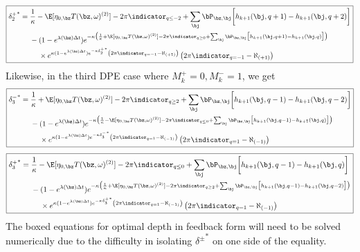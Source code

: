 \documentclass[12pt]{article}
\begin{document}
\begin{equation}
\label{eq:discretedeltaplus2feedback}
\boxed{
\begin{split}
{\delta_{2}^+}^* & = \frac{1}{\kappa} - \E[\eta_{0,\bz} T(\bz, \omega)^{(2)}] - 2 \pi \indicator_{q \leq -2} + \sum_\bj \bP_{\bz,\bj} \biggl[ h_{k+1}(\bj, q+1) - h_{k+1}(\bj, q+2) \biggr] \\
& \hphantom{{}={}} - (1-e^{\lambda (\bz) \Delta t})e^{-\kappa \bigl( \frac{1}{\kappa} + \E[\eta_{0,\bz} T(\bz, \omega)^{(2)}] - 2 \pi \indicator_{q \geq 0} + \sum_\bj \bP_{\bz,\bj} \bigl[ h_{k+1}(\bj, q+1) - h_{k+1}(\bj, q) \bigr] \bigr) } \\
& \hphantom{{}={} {}-{}} \times e^{\kappa (1-e^{\lambda (\bz) \Delta t})e^{-\kappa {\delta_{2}^+}^*} \left( 2 \pi \indicator_{q = -1} - \aleph_{(+1)} \right)} \left( 2 \pi \indicator_{q = -1} - \aleph_{(+1)} \right)
\end{split}
}
\end{equation}
Likewise, in the third DPE case where $M_k^+ =0, M_k^-=1$, we get
\begin{equation}
\label{eq:discretedeltaminus3feedback}
\boxed{
\begin{split}
{\delta_{3}^-}^* & = \frac{1}{\kappa} + \E[\eta_{0,\bz} T(\bz, \omega)^{(2)}] - 2 \pi \indicator_{q \geq 2} + \sum_\bj \bP_{\bz,\bj} \biggl[ h_{k+1}(\bj, q-1) - h_{k+1}(\bj, q-2) \biggr] \\
& \hphantom{{}={}} - (1-e^{\lambda (\bz) \Delta t})e^{-\kappa \bigl( \frac{1}{\kappa} - \E[\eta_{0,\bz} T(\bz, \omega)^{(2)}] - 2 \pi \indicator_{q \leq 0} + \sum_\bj \bP_{\bz,\bj} \bigl[ h_{k+1}(\bj, q-1) - h_{k+1}(\bj, q) \bigr] \bigr) } \\
& \hphantom{{}={} {}-{}} \times e^{\kappa (1-e^{\lambda (\bz) \Delta t})e^{-\kappa {\delta_{3}^-}^*} \left( 2 \pi \indicator_{q = 1} - \aleph_{(-1)} \right)} \left( 2 \pi \indicator_{q = 1} - \aleph_{(-1)} \right)
\end{split}
}
\end{equation}
\begin{equation}
\label{eq:discretedeltaplus3feedback}
\boxed{
\begin{split}
{\delta_{3}^+}^* & = \frac{1}{\kappa} - \E[\eta_{0,\bz} T(\bz, \omega)^{(2)}] - 2 \pi \indicator_{q \leq 0} + \sum_\bj \bP_{\bz,\bj} \biggl[ h_{k+1}(\bj, q-1) - h_{k+1}(\bj, q) \biggr] \\
& \hphantom{{}={}} - (1-e^{\lambda (\bz) \Delta t})e^{-\kappa \bigl( \frac{1}{\kappa} + \E[\eta_{0,\bz} T(\bz, \omega)^{(2)}] - 2 \pi \indicator_{q \geq 2} + \sum_\bj \bP_{\bz,\bj} \bigl[ h_{k+1}(\bj, q-1) - h_{k+1}(\bj, q-2) \bigr] \bigr) } \\
& \hphantom{{}={} {}-{}} \times e^{\kappa (1-e^{\lambda (\bz) \Delta t})e^{-\kappa {\delta_{3}^+}^*} \left( 2 \pi \indicator_{q = 1} - \aleph_{(-1)} \right)} \left( 2 \pi \indicator_{q = 1} - \aleph_{(-1)} \right)
\end{split}
}
\end{equation}
The boxed equations for optimal depth in feedback form will need to be solved numerically due to the difficulty in isolating ${\delta^{\pm}}^*$ on one side of the equality. 
\end{document}
